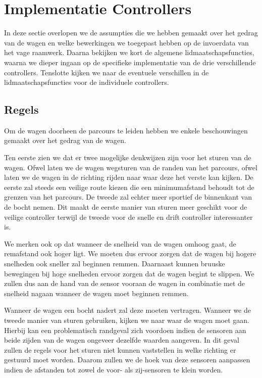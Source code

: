 \section{Implementatie Controllers}
In deze sectie overlopen we de assumpties die we hebben gemaakt over het gedrag van 
de wagen en welke bewerkingen we toegepast hebben op de invoerdata van het vage 
raamwerk. Daarna bekijken we kort de algemene lidmaatschapsfuncties, waarna we 
dieper ingaan op de specifieke implementatie van de drie verschillende 
controllers. Tenslotte kijken we naar de eventuele verschillen in de lidmaatschapsfuncties voor de individuele controllers.

\subsection{Regels}

Om de wagen doorheen de parcours te leiden hebben we enkele beschouwingen gemaakt over het gedrag van de wagen.

Ten eerste zien we dat er twee mogelijke denkwijzen zijn voor het sturen van de wagen. Ofwel laten we de wagen wegsturen van de randen van het parcours, ofwel laten we de wagen in de richting rijden naar waar deze het verste kan kijken. De eerste zal steeds een veilige route kiezen die een minimumafstand behoudt tot de grenzen van het parcours. De tweede zal echter meer sportief de binnenkant van de bocht nemen. Dit maakt de eerste manier van sturen meer geschikt voor de veilige controller terwijl de tweede voor de snelle en drift controller interessanter is.

We merken ook op dat wanneer de snelheid van de wagen omhoog gaat, de remafstand ook hoger ligt. We moeten dus ervoor zorgen dat de wagen bij hogere snelheden ook sneller zal beginnen remmen. Daarnaast kunnen bruuske bewegingen bij hoge snelheden ervoor zorgen dat de wagen begint te slippen. We zullen dus aan de hand van de sensor vooraan de wagen in combinatie met de snelheid nagaan wanneer de wagen moet beginnen remmen.

Wanneer de wagen een bocht nadert zal deze moeten vertragen. Wanneer we de 
tweede manier van sturen gebruiken, kijken we naar waar de wagen moet gaan. 
Hierbij kan een problematisch randgeval zich voordoen indien de sensoren aan 
beide zijden van de wagen ongeveer dezelfde waarden aangeven. In dit geval zullen de regels voor het sturen niet kunnen vaststellen in welke richting er gestuurd moet worden. Daarom zullen we 
de hoek van deze sensoren aanpassen indien de afstanden tot zowel de voor- als 
zij-sensoren te klein worden.

